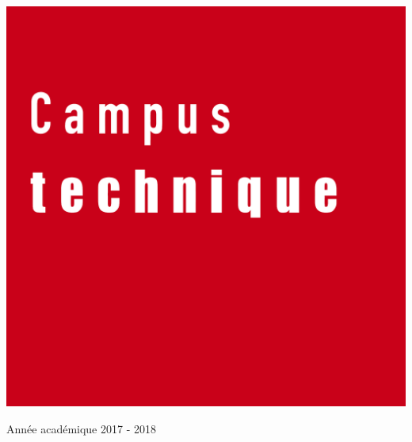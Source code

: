 \begin{center}
  \vspace{2.5cm}

  \includegraphics[scale=0.08]{textures/logo/technical.pdf}

  \vspace{0.5cm}

  Année académique 2017 - 2018
\end{center}

\thispagestyle{empty}
